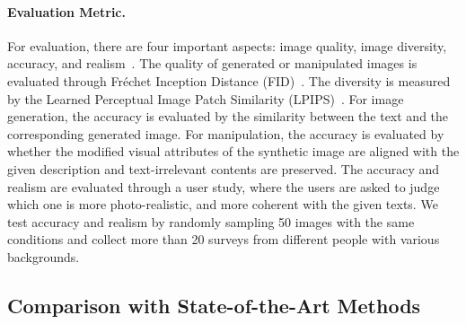 \documentclass[final]{cvpr}
\begin{document}
\vspace{-5pt}
\paragraph{Evaluation Metric.} 
For evaluation, there are four important aspects: image quality, image diversity, accuracy, and realism~\cite{li2019control,li2020lightweight}.
The quality of generated or manipulated images is evaluated through Fr\'echet Inception Distance (FID)~\cite{heusel2017gans}.
The diversity is measured by the Learned Perceptual Image Patch Similarity (LPIPS)~\cite{zhang2018unreasonable}. 
For image generation, the accuracy is evaluated by the similarity between the text and the corresponding generated image.
For manipulation, the accuracy is evaluated by whether the modified visual attributes of the synthetic image are aligned with the given description and text-irrelevant contents are preserved.
The accuracy and realism are evaluated through a user study, where the users are asked to judge which one is more photo-realistic, and more coherent with the given texts.
We test accuracy and realism by randomly sampling 50 images with the same conditions and collect more than 20 surveys from different people with various backgrounds.

\begin{table}[th]
\centering
\caption{{Quantitative Comparison of Text-Guided Image Manipulation.} We use FID, accuracy (Acc.), and realism (Real.) to compare with the state of the art ManiGAN~\cite{li2020manigan}.}
\label{tab:quan_man}
\end{table}


\subsection{Comparison with State-of-the-Art Methods}
\label{subsec:comparison}
\end{document}

